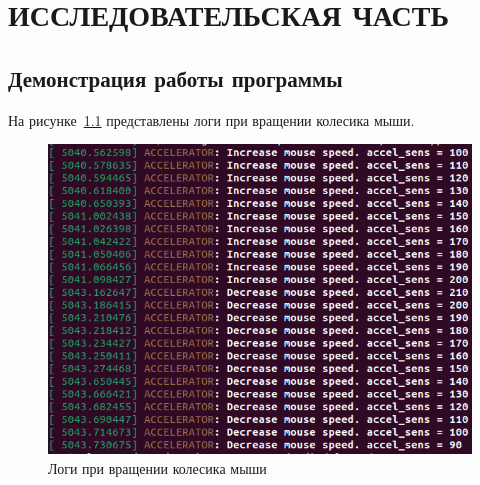 
\chapter{ИССЛЕДОВАТЕЛЬСКАЯ ЧАСТЬ}

\section{Демонстрация работы программы}

На рисунке~\ref{fig:demo} представлены логи при вращении колесика мыши.
\captionsetup{justification=centering,singlelinecheck=off}
\begin{figure}[H]
	\centering
	\includegraphics[width=0.7\linewidth]{inc/demo}
	\caption{Логи при вращении колесика мыши}
	\label{fig:demo}
\end{figure}